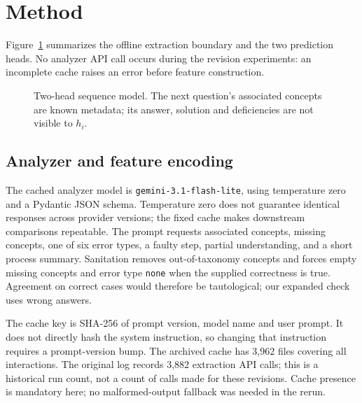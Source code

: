 \documentclass[11pt]{article}
\newcommand{\code}[1]{\texttt{\small #1}}
\begin{document}
\section{Method}
Figure~\ref{fig:pipeline} summarizes the offline extraction boundary and the two prediction heads. No analyzer API call occurs during the revision experiments: an incomplete cache raises an error before feature construction.
\begin{figure}[htbp]\centering
{}
\caption{Two-head sequence model. The next question's associated concepts are known metadata; its answer, solution and deficiencies are not visible to $h_i$.}\label{fig:pipeline}
\end{figure}

\subsection{Analyzer and feature encoding}
The cached analyzer model is \code{gemini-3.1-flash-lite}, using temperature zero and a Pydantic JSON schema. Temperature zero does not guarantee identical responses across provider versions; the fixed cache makes downstream comparisons repeatable. The prompt requests associated concepts, missing concepts, one of six error types, a faulty step, partial understanding, and a short process summary. Sanitation removes out-of-taxonomy concepts and forces empty missing concepts and error type \code{none} when the supplied correctness is true. Agreement on correct cases would therefore be tautological; our expanded check uses wrong answers.

The cache key is SHA-256 of prompt version, model name and user prompt. It does not directly hash the system instruction, so changing that instruction requires a prompt-version bump. The archived cache has 3,962 files covering all interactions. The original log records 3,882 extraction API calls; this is a historical run count, not a count of calls made for these revisions. Cache presence is mandatory here; no malformed-output fallback was needed in the rerun.
\end{document}
